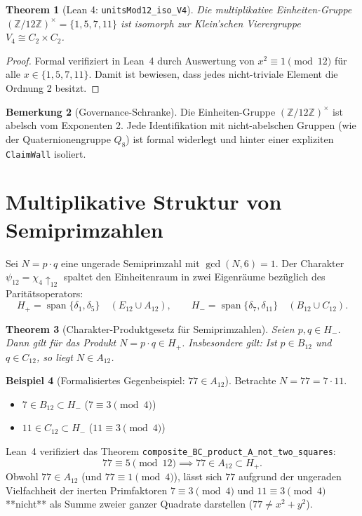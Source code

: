 \documentclass[11pt,a4paper]{article}
\newtheorem{theorem}{Theorem}[section]
\theoremstyle{definition}
\newtheorem{example}[theorem]{Beispiel}
\newtheorem{remark}[theorem]{Bemerkung}
\begin{document}
	\begin{theorem}[Lean 4: \texttt{unitsMod12\_iso\_V4}]
		Die multiplikative Einheiten-Gruppe $(\mathbb{Z}/12\mathbb{Z})^\times = \{1, 5, 7, 11\}$ ist isomorph zur Klein'schen Vierergruppe $V_4 \cong C_2 \times C_2$.
	\end{theorem}
	\begin{proof}
		Formal verifiziert in Lean~4 durch Auswertung von $x^2 \equiv 1 \pmod{12}$ für alle $x \in \{1, 5, 7, 11\}$. Damit ist bewiesen, dass jedes nicht-triviale Element die Ordnung 2 besitzt.
	\end{proof}
	
	\begin{remark}[Governance-Schranke]
		Die Einheiten-Gruppe $(\mathbb{Z}/12\mathbb{Z})^\times$ ist abelsch vom Exponenten 2. Jede Identifikation mit nicht-abelschen Gruppen (wie der Quaternionengruppe $Q_8$) ist formal widerlegt und hinter einer expliziten \texttt{ClaimWall} isoliert.
	\end{remark}
	
	\section{Multiplikative Struktur von Semiprimzahlen}
	
	Sei $N = p \cdot q$ eine ungerade Semiprimzahl mit $\gcd(N, 6) = 1$. Der Charakter $\psi_{12} = \chi_4 \uparrow_{12}$ spaltet den Einheitenraum in zwei Eigenräume bezüglich des Paritätsoperators:
	\[
	H_+ = \operatorname{span}\{\delta_1, \delta_5\} \quad (E_{12} \cup A_{12}), \qquad H_- = \operatorname{span}\{\delta_7, \delta_{11}\} \quad (B_{12} \cup C_{12}).
	\]
	
	\begin{theorem}[Charakter-Produktgesetz für Semiprimzahlen]
		Seien $p, q \in H_-$. Dann gilt für das Produkt $N = p \cdot q \in H_+$. Insbesondere gilt: Ist $p \in B_{12}$ und $q \in C_{12}$, so liegt $N \in A_{12}$.
	\end{theorem}
	
	\begin{example}[Formalisiertes Gegenbeispiel: $77 \in A_{12}$]
		Betrachte $N = 77 = 7 \cdot 11$.
		\begin{itemize}
			\item $7 \in B_{12} \subset H_-$ ($7 \equiv 3 \pmod 4$)
			\item $11 \in C_{12} \subset H_-$ ($11 \equiv 3 \pmod 4$)
		\end{itemize}
		Lean~4 verifiziert das Theorem \texttt{composite\_BC\_product\_A\_not\_two\_squares}:
		\[
		77 \equiv 5 \pmod{12} \implies 77 \in A_{12} \subset H_+.
		\]
		Obwohl $77 \in A_{12}$ (und $77 \equiv 1 \pmod 4$), lässt sich $77$ aufgrund der ungeraden Vielfachheit der inerten Primfaktoren $7 \equiv 3 \pmod 4$ und $11 \equiv 3 \pmod 4$ **nicht** als Summe zweier ganzer Quadrate darstellen ($77 \neq x^2 + y^2$).
	\end{example}
	
\end{document}
